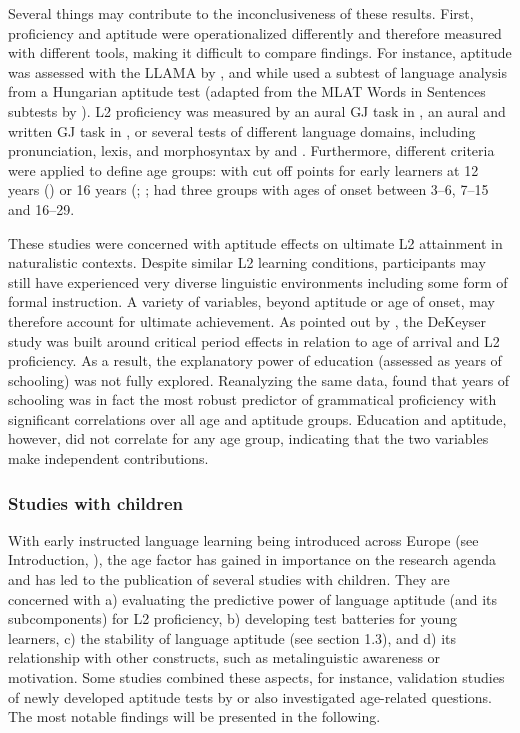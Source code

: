 \documentclass[output=paper]{langscibook}
\begin{document}
Several things may contribute to the inconclusiveness of these results. First, proficiency and aptitude were operationalized differently and therefore measured with different tools, making it difficult to compare findings. For instance, aptitude was assessed with the LLAMA \citep{MearaEtAl2001} by \citet{AbrahamssonHyltenstam2008}, and \citet{GranenaLong2012} while \citet{DeKeyser2000} used a subtest of language analysis from a Hungarian aptitude test (adapted from the MLAT Words in Sentences subtests by \citealt{Otto1996}). L2 proficiency was measured by an aural GJ task in \citet{DeKeyser2000}, an aural and written GJ task in \citet{AbrahamssonHyltenstam2008}, or several tests of different language domains, including pronunciation, lexis, and morphosyntax by \citet{GranenaLong2012} and \citet{Granena2012}. Furthermore, different criteria were applied to define age groups: with cut off points for early learners at 12 years (\citealt{AbrahamssonHyltenstam2008}) or 16 years (\citealt{DeKeyser2000}; \citet{GranenaLong2012}; \citet{Granena2012} had three groups with ages of onset between 3--6, 7--15 and 16--29. 

These studies were concerned with aptitude effects on ultimate L2 attainment in naturalistic contexts. Despite similar L2 learning conditions, participants may still have experienced very diverse linguistic environments including some form of formal instruction. A variety of variables, beyond aptitude or age of onset, may therefore account for ultimate achievement. As pointed out by \citet{Birdsong2014}, the DeKeyser study was built around critical period effects in relation to age of arrival and L2 proficiency. As a result, the explanatory power of education (assessed as years of schooling) was not fully explored. Reanalyzing the same data, \citet{Birdsong2014} found that years of schooling was in fact the most robust predictor of grammatical proficiency with significant correlations over all age and aptitude groups. Education and aptitude, however, did not correlate for any age group, indicating that the two variables make independent contributions.

\subsubsection{Studies with children} %

With early instructed language learning being introduced across Europe (see Introduction, ), the age factor has gained in importance on the research agenda and has led to the publication of several studies with children. They are concerned with a) evaluating the predictive power of language aptitude (and its subcomponents) for L2 proficiency, b) developing test batteries for young learners, c) the stability of language aptitude (see section 1.3), and d) its relationship with other constructs, such as metalinguistic awareness or motivation. Some studies combined these aspects, for instance, validation studies of newly developed aptitude tests by \citet{KissNikolov2005} or \citet{SuarezVilagran2010} also investigated age-related questions. The most notable findings will be presented in the following.
\end{document}
